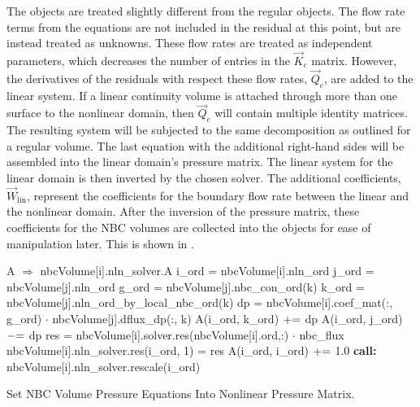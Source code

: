 The  objects are treated slightly different from the regular  objects.
The flow rate terms from the equations are not included in the residual at this point, but are instead treated as unknowns.
These flow rates are treated as independent parameters, which decreases the number of entries in the $\vec{K}_{c}$ matrix.
However, the derivatives of the residuals with respect these flow rates, $\vec{Q}_{c}$, are added to the linear system.
If a linear continuity volume is attached through more than one surface to the nonlinear domain, then $\vec{Q}_{c}$ will contain multiple identity matrices.
The resulting system will be subjected to the same  decomposition as outlined for a regular volume.
The last equation with the additional right-hand sides will be assembled into the linear domain's pressure matrix.
The linear system for the linear domain is then inverted by the chosen solver.
The additional coefficients, $\vec{W}_{\text{lin}}$, represent the coefficients for the boundary flow rate between the linear and the nonlinear domain.
After the inversion of the pressure matrix, these coefficients for the NBC volumes are collected into the  objects for ease of manipulation later.
This is shown in .

\begin{algo}[ht!]
\setlength{\baselineskip}{0.625\baselineskip}
\begin{algorithmic}[1]
	\Set A $\Rightarrow$ nbcVolume[i].nln\_solver.A
	\Set i\_ord = nbcVolume[i].nln\_ord
		\Set j\_ord = nbcVolume[j].nln\_ord
			\Set g\_ord = nbcVolume[j].nbc\_con\_ord(k)
			\Set k\_ord = nbcVolume[j].nln\_ord\_by\_local\_nbc\_ord(k)
			\Set dp = nbcVolume[i].coef\_mat(:, g\_ord) $\cdot$ nbcVolume[j].dflux\_dp(:, k)
			\Set A(i\_ord, k\_ord) $\mathrel{+}=$ dp
			\Set A(i\_ord, j\_ord) $\mathrel{-}=$ dp
		\EndFor
	\EndFor
	\Set res = nbcVolume[i].solver.res(nbcVolume[i].ord,:) $\cdot$ nbc\_flux
	\Set nbcVolume[i].nln\_solver.res(i\_ord, 1) = res
	\Set A(i\_ord, i\_ord) $\mathrel{+}=$ 1.0
	\State \textbf{call:} nbcVolume[i].nln\_solver.rescale(i\_ord)
\EndFor
\end{algorithmic}
\caption{Set NBC Volume Pressure Equations Into Nonlinear Pressure Matrix.}
\label{alg:domDecompSetMat}
\end{algo}

